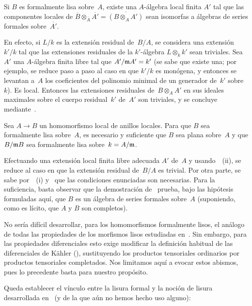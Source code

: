 \begin{corollaire}
\label{III.1.6}
Si $B$ es formalmente lisa sobre~$A$, existe una $A$-álgebra local finita $A'$ tal que las componentes locales de
$\overline{B}\otimes_{\overline{A}}\overline{A'}=\overline{(B\otimes_A A')}$
sean isomorfas a álgebras de series formales sobre~$\overline{A'}$.
\end{corollaire}
En efecto, si $L/k$ es la extensión residual de~$B/A$, se considera una extensión $k'/k$ tal que las extensiones residuales de la $k'$-álgebra $L\otimes_k k'$ sean triviales. Sea $A'$ una $A$-álgebra finita libre tal que $A'/\mathfrak{m}A'=k'$ (se sabe que existe una; por ejemplo, se reduce paso a paso al caso en que $k'/k$ es monógena, y entonces se levantan a~$A$ los coeficientes del polinomio minimal de un generador de~$k'$ sobre~$k$). Es local. Entonces las extensiones residuales de~$B\otimes_A A'$ en sus ideales maximales sobre el cuerpo residual~$k'$ de~$A'$ son triviales, y se concluye mediante~.

\begin{corollaire}
\label{III.1.7}
Sea $A\to B$ un homomorfismo local de anillos locales. Para que $B$ sea formalmente lisa sobre~$A$, es necesario y suficiente que $B$ sea plana sobre~$A$ y que $B/\mathfrak{m}B$ sea formalmente lisa sobre~$k=A/\mathfrak{m}$.
\end{corollaire}
Efectuando una extensión local finita libre adecuada $A'$ de~$A$ y usando~~(ii), se reduce al caso en que la extensión residual de~$B/A$ es trivial.
Por otra parte, se sabe por~~(i) y~ que las condiciones enunciadas son necesarias. Para la suficiencia, basta observar que la demostración de~ prueba, bajo las hipótesis formuladas aquí, que $B$ es un álgebra de series formales sobre~$A$ (suponiendo, como es lícito, que $A$ y $B$ son completos).

\begin{remarque}
\label{III.1.8}
No sería difícil desarrollar, para los homomorfismos formalmente lisos, el análogo de todas las propiedades de los morfismos lisos estudiadas en~. Sin embargo, para las propiedades diferenciales esto exige modificar la definición habitual de las diferenciales de Kähler (\cf {}), sustituyendo los productos tensoriales ordinarios por productos tensoriales completados. Nos limitamos aquí a evocar estos abismos, pues lo precedente basta para nuestro propósito.

Queda establecer el vínculo entre la lisura formal y la noción de lisura desarrollada en~ (y de la que aún no hemos hecho uso alguno):
\end{remarque}

